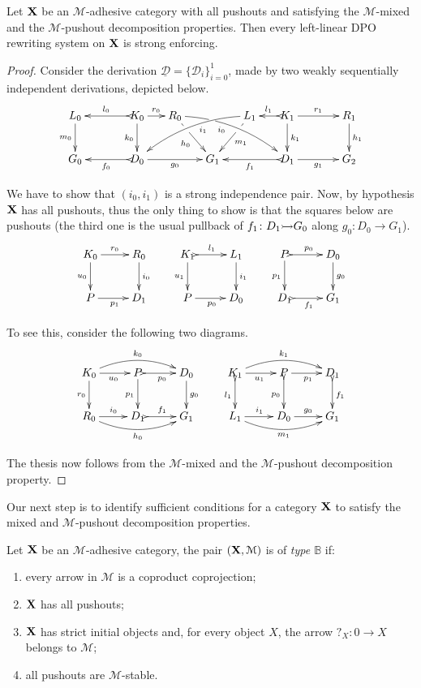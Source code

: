 \documentclass[a4paper,UKenglish,cleveref,pdftex,thm-restate,numberwithinsect,anonymous]{lipics}
\newcommand{\mto}[0]{\scalebox{1}{$\rightarrowtail$}}
\def\X{\textbf {\textup{X}}}
\def\G{\textbf {\textup{G}}}
\newcommand{\dder}[1]{\mathscr{#1}}
\newcommand{\der}[1]{\underline{\dder{#1}}}
\begin{document}
\begin{theorem}\label{thm:good1}Let $\X$ be an $\mathcal{M}$-adhesive category with all pushouts and satisfying the $\mathcal{M}$-mixed and the $\mathcal{M}$-pushout decomposition properties. Then every left-linear DPO rewriting system on $\X$ is strong enforcing.
\end{theorem}
\begin{proof}
	Consider the derivation $\der{D}=\{\dder{D}_i\}_{i=0}^1$, made by two weakly sequentially independent derivations, depicted below.
	\[\xymatrix@C=15pt{L_0 \ar[d]_{m_0}&& K_0 \ar[d]_{k_0}\ar@{>->}[ll]_{l_0} \ar[r]^{r_0} & R_0 \ar@/^.35cm/[drrr]|(.3)\hole_(.4){i_0} \ar[dr]|(.3)\hole_{h_0} && L_1 \ar@/_.35cm/[dlll]^(.4){i_1} \ar[dl]|(.3)\hole^{m_1}& K_1 \ar[d]^{k_1}\ar@{>->}[l]_{l_1} \ar[rr]^{r_1} && R_1 \ar[d]^{h_1} \\G_0 && \ar@{>->}[ll]^{f_0} D_0 \ar[rr]_{g_0}&& G_1  && \ar@{>->}[ll]^{f_1} D_1 \ar[rr]_{g_1}&& G_2 }\]

	We have to show that $(i_0, i_1)$ is a strong independence pair. Now, by hypothesis $\X$ has all pushouts, thus the only thing to show is that the squares below are pushouts (the third one is the usual pullback of $f_1\colon D_1\mto G_0$ along $g_0\colon D_0\to G_1$).
	\[\xymatrix{K_0 \ar[r]^{r_0}  \ar[d]_{u_0}& R_0 \ar[d]^{i_0} & K_1 \ar@{>->}[r]^{l_1}  \ar[d]_{u_1}& L_1 \ar[d]^{i_1}&P \ar@{>->}[r]^{p_0} \ar[d]_{p_1}& D_0\ar[d]^{g_0} \\ P \ar[r]_{p_1} & D_1 &P \ar[r]_{p_0}  & D_0&D_1 \ar@{>->}[r]_{f_1} & G_1}\]

	To see this, consider the following two diagrams.
	\[\xymatrix{K_0 \ar@/^.4cm/[rr]^{k_0} \ar[d]_{r_0} \ar[r]_{u_0}& \ar@{>->}[r]_{p_0} P \ar[d]_{p_1}& D_0 \ar[d]^{g_0}&K_1 \ar@/^.4cm/[rr]^{k_1} \ar@{>->}[d]_{l_1} \ar[r]_{u_1}& \ar[r]_{p_1} P \ar@{>->}[d]_{p_0}& D_1 \ar@{>->}[d]^{f_1}\\ R_0 \ar@/_.4cm/[rr]_{h_0}  \ar[r]^{i_0}& D_1 \ar@{>->}[r]^{f_1}& G_1 &L_1 \ar@/_.4cm/[rr]_{m_1}  \ar[r]^{i_1}& D_0 \ar[r]^{g_0}& G_1}\]

	The thesis now follows from the $\mathcal{M}$-mixed and the $\mathcal{M}$-pushout decomposition property.
\end{proof}

Our next step is to identify sufficient conditions for a category $\X$ to satisfy the mixed and $\mathcal{M}$-pushout decomposition properties.

\begin{definition} 
	Let $\X$ be an  $\mathcal{M}$-adhesive category, the pair $(\X, \mathcal{M})$ is of \emph{type $\mathbb{B}$} if:
	\begin{enumerate}
		\item every arrow in $\mathcal{M}$ is a coproduct coprojection;
		\item $\X$ has all pushouts;
		\item $\X$ has strict initial objects and, for every object $X$, the arrow $?_X\colon 0\to X $ belongs to $\mathcal{M}$;
		\item all pushouts are $\mathcal{M}$-stable.
	\end{enumerate}
\end{definition}
\end{document}

